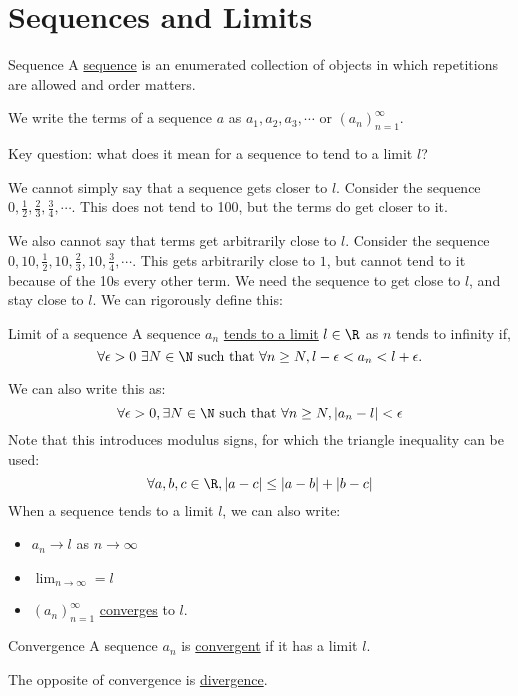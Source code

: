 \documentclass[../Main.tex]{subfiles}
\begin{document}
\section{Sequences and Limits}
\begin{definition}{Sequence}
    A \underline{sequence} is an enumerated collection of objects in which repetitions are allowed and order matters.
\end{definition}
We write the terms of a sequence $a$ as $a_1, a_2, a_3, \cdots$ or $(a_n)_{n=1}^\infty$.\par
Key question: what does it mean for a sequence to tend to a limit $l$?\par
We cannot simply say that a sequence gets closer to $l$. Consider the sequence $0, \frac{1}{2}, \frac{2}{3}, \frac{3}{4}, \cdots$. This does not tend to 100, but the terms do get closer to it.\par
We also cannot say that terms get arbitrarily close to $l$. Consider the sequence $0, 10, \frac{1}{2}, 10, \frac{2}{3}, 10, \frac{3}{4}, \cdots$. This gets arbitrarily close to $1$, but cannot tend to it because of the 10s every other term. We need the sequence to get close to $l$, and stay close to $l$. We can rigorously define this:
\begin{definition}{Limit of a sequence}
    A sequence $a_n$ \underline{tends to a limit} $l \in \R$ as $n$ tends to infinity if,
    \begin{equation*}
        \forall \epsilon > 0~\exists N \in \N \text{ such that } \forall n \geq N, l - \epsilon < a_n < l + \epsilon.
    \end{equation*}
\end{definition}
We can also write this as:
\begin{equation}
    \forall \epsilon > 0, \exists N \in \N \text{ such that } \forall n \geq N, |a_n - l| < \epsilon
    \label{eqnSequenceLimit}
\end{equation}
Note that this introduces modulus signs, for which the triangle inequality can be used:
\begin{equation}
    \forall a, b, c \in \R, |a - c| \leq |a - b| + |b - c|
    \label{eqnTriangleInequality}
\end{equation}
When a sequence tends to a limit $l$, we can also write:
\begin{itemize}
    \item $a_n \rightarrow l$ as $n \rightarrow \infty$
    \item $\lim_{n \rightarrow \infty} = l$
    \item $(a_n)_{n=1}^\infty$ \underline{converges} to $l$.
\end{itemize}
\begin{definition}{Convergence}
    A sequence $a_n$ is \underline{convergent} if it has a limit $l$.
\end{definition}
The opposite of convergence is \underline{divergence}.
\end{document}
